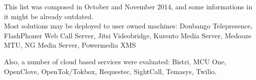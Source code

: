 \comment
{}%
This list was composed in October and November 2014, and some informations in it might be already outdated.\\

Most solutions may be deployed to user owned machines:
Doubango Telepresence, FlashPhoner Web Call Server, Jitsi Videobridge, Kurento Media Server, Medooze MTU, NG Media Server, Powermedia XMS
\endcomment

\renewcommand{\leftmark}{Comparsion of media servers}
\renewcommand{\rightmark}{Media server solutions for self deployment}



\comment
Also, a number of cloud based services were evaluated: Bistri, MCU One, OpenClove, OpenTok/Tokbox, Requestec, SightCall, Temasys, Twilio.
\endcomment

\renewcommand{\rightmark}{Cloud based media server solutions}

